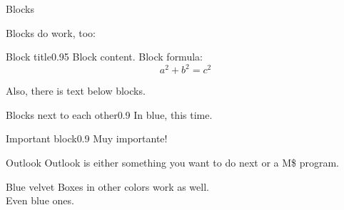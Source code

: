 \begin{greenbox}{Blocks}

Blocks do work, too:\\
\begin{greenblock}{Block title}{0.95\textwidth} %
Block content. Block formula:\\
\[ a^2+b^2=c^2\]
\end{greenblock}

Also, there is text below blocks.

\begin{minipage}{\textwidth}
	
\begin{minipage}{0.475\textwidth}
\begin{blueblock}{Blocks next to each other}{0.9\textwidth}
In blue, this time.
\end{blueblock}
\end{minipage}
\begin{minipage}{0.475\textwidth}
\begin{redblock}{Important block}{0.9\textwidth}
Muy importante!
\end{redblock}
\end{minipage}
\end{minipage}

\end{greenbox}

\begin{redbox}{Outlook}
Outlook is either something you want to do next or a M\$ program.
\end{redbox}

\begin{bluebox}{Blue velvet}
Boxes in other colors work as well.\\
Even blue ones.
\end{bluebox}

